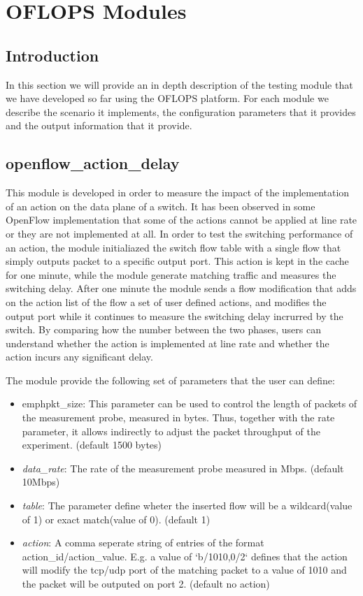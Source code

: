 \documentclass{book}
\begin{document}
\chapter{OFLOPS Modules}
\label{oflops-modules}

\section{Introduction}

In this section we will provide an in depth description of the testing module
that we have developed  so far using the OFLOPS platform. For each module we describe
the scenario it implements, the configuration parameters that it provides and
the output information that it provide. 

\section{openflow\_action\_delay}        

This module is developed in order to measure the impact of the implementation 
of an action on the data plane of a switch. It has been observed in 
some OpenFlow implementation that some of the actions cannot be applied at 
line rate or they are not implemented at all. In order to test the switching
performance of an action, the module initialiazed the switch flow table with a
single flow that simply outputs packet to a specific output port. This action is
kept in the cache for one minute, while the module generate matching traffic and
measures the switching delay. After one minute the module sends a flow
modification that adds on the action list of the flow a set of user defined
actions, and modifies the output port while it continues to measure the switching 
delay incrurred by the switch. By comparing how the number between the two
phases, users can understand whether the action is implemented at line rate and
whether the action incurs any significant delay. 

The module provide the following set of parameters that the user can define:
\begin{itemize}
\item emph{pkt\_size}: This parameter can be used to control the length of
packets of the measurement probe, measured in bytes. Thus, together with the 
rate parameter, it allows indirectly to adjust the packet throughput of the 
experiment. (default 1500 bytes)
\item \emph{data\_rate}: The rate of the measurement probe measured in Mbps.
(default 10Mbps) 
\item \emph{table}: The parameter define wheter the inserted flow will be 
a wildcard(value of 1) or exact match(value of 0).  (default 1)
\item \emph{action}:  A comma seperate string of entries of the format
action\_id/action\_value. E.g. a value of `b/1010,0/2` defines that the action
will modify the tcp/udp port of the matching packet to a value of 1010 and the
packet will be outputed on port 2. (default no action)
\end{itemize}
\end{document}
